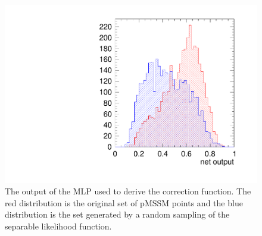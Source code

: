\begin{figure}[h]
\centering
  \includegraphics[width=0.6\linewidth]{figures/pMSSMpaper/Prior/CompareFrequentist/figpmssmnettrain}
\caption{The output of the MLP used to derive the correction function. The red distribution is the original set of pMSSM points and the blue distribution is the set generated by a random sampling of the separable likelihood function. }
\label{fig:Classifier}
\end{figure}



